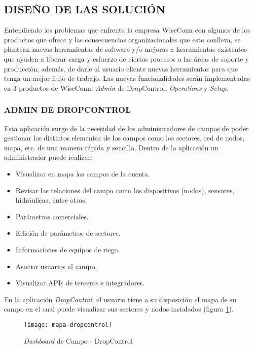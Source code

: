 

\subsection{DISEÑO DE LAS SOLUCIÓN}

Entendiendo los problemas que enfrenta la empresa WiseConn con algunos de los productos que ofrece y las consecuencias organizacionales que esto conlleva,
se plantean nuevas herramientas de software y/o mejoras a herramientas existentes que ayuden a liberar carga y esfuerzo
de ciertos procesos a las áreas de soporte y producción, además, de darle al usuario cliente nuevas herramientas para que tenga un mejor flujo de trabajo.
Las nuevas funcionalidades serán implementadas en 3 productos de WiseConn: \textit{Admin} de DropControl, \textit{Operations} y \textit{Setup}.

\subsubsection{ADMIN DE DROPCONTROL}

Esta aplicación surge de la necesidad de los administradores de campos de poder gestionar los distintos elementos de los campos como los sectores, red de nodos, mapa, etc. de una manera rápida y sencilla.
Dentro de la aplicación un administrador puede realizar:

\begin{itemize}
    \item Visualizar en mapa los campos de la cuenta.
    \item Revisar las relaciones del campo como los dispositivos (nodos), sensores, hidráulicas, entre otros.
    \item Parámetros comerciales.
    \item Edición de parámetros de sectores.
    \item Informaciones de equipos de riego.
    \item Asociar usuarios al campo.
    \item Visualizar APIs de terceros e integradores.
\end{itemize}


En la aplicación \textit{DropControl}, el usuario tiene a su disposición el mapa de su campo en el cual puede visualizar sus sectores y nodos instalados (figura \ref{fig:mapa-dropcontrol}).
\begin{figure}[H]
	\centering
	\texttt{[image: mapa-dropcontrol]}
	\caption{\label{fig:mapa-dropcontrol} \textit{Dashboard} de Campo - DropControl}
\end{figure}

